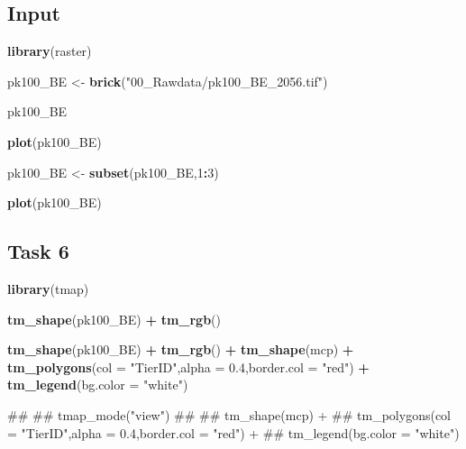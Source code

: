 \documentclass[]{book}
\newenvironment{Shaded}{\begin{snugshade}}{\end{snugshade}}
\newcommand{\KeywordTok}[1]{\textcolor[rgb]{0.13,0.29,0.53}{\textbf{#1}}}
\newcommand{\DataTypeTok}[1]{\textcolor[rgb]{0.13,0.29,0.53}{#1}}
\newcommand{\DecValTok}[1]{\textcolor[rgb]{0.00,0.00,0.81}{#1}}
\newcommand{\FloatTok}[1]{\textcolor[rgb]{0.00,0.00,0.81}{#1}}
\newcommand{\StringTok}[1]{\textcolor[rgb]{0.31,0.60,0.02}{#1}}
\newcommand{\OperatorTok}[1]{\textcolor[rgb]{0.81,0.36,0.00}{\textbf{#1}}}
\newcommand{\NormalTok}[1]{#1}
\begin{document}
\subsection{Input}\label{input-2}

\begin{Shaded}
\begin{Highlighting}[]

\KeywordTok{library}\NormalTok{(raster)}

\NormalTok{pk100_BE <-}\StringTok{ }\KeywordTok{brick}\NormalTok{(}\StringTok{"00_Rawdata/pk100_BE_2056.tif"}\NormalTok{)}

\NormalTok{pk100_BE}

\KeywordTok{plot}\NormalTok{(pk100_BE)}

\NormalTok{pk100_BE <-}\StringTok{ }\KeywordTok{subset}\NormalTok{(pk100_BE,}\DecValTok{1}\OperatorTok{:}\DecValTok{3}\NormalTok{)}

\KeywordTok{plot}\NormalTok{(pk100_BE)}
\end{Highlighting}
\end{Shaded}

\subsection{Task 6}\label{task-6}

\begin{Shaded}
\begin{Highlighting}[]
\KeywordTok{library}\NormalTok{(tmap)}


\KeywordTok{tm_shape}\NormalTok{(pk100_BE) }\OperatorTok{+}\StringTok{ }
\StringTok{  }\KeywordTok{tm_rgb}\NormalTok{() }

\KeywordTok{tm_shape}\NormalTok{(pk100_BE) }\OperatorTok{+}\StringTok{ }
\StringTok{  }\KeywordTok{tm_rgb}\NormalTok{() }\OperatorTok{+}
\StringTok{  }\KeywordTok{tm_shape}\NormalTok{(mcp) }\OperatorTok{+}
\StringTok{  }\KeywordTok{tm_polygons}\NormalTok{(}\DataTypeTok{col =} \StringTok{"TierID"}\NormalTok{,}\DataTypeTok{alpha =} \FloatTok{0.4}\NormalTok{,}\DataTypeTok{border.col =} \StringTok{"red"}\NormalTok{) }\OperatorTok{+}
\StringTok{  }\KeywordTok{tm_legend}\NormalTok{(}\DataTypeTok{bg.color =} \StringTok{"white"}\NormalTok{)}


\NormalTok{## }
\NormalTok{## tmap_mode("view")}
\NormalTok{## }
\NormalTok{## tm_shape(mcp) +}
\NormalTok{##   tm_polygons(col = "TierID",alpha = 0.4,border.col = "red") +}
\NormalTok{##   tm_legend(bg.color = "white")}
\end{Highlighting}
\end{Shaded}
\end{document}
